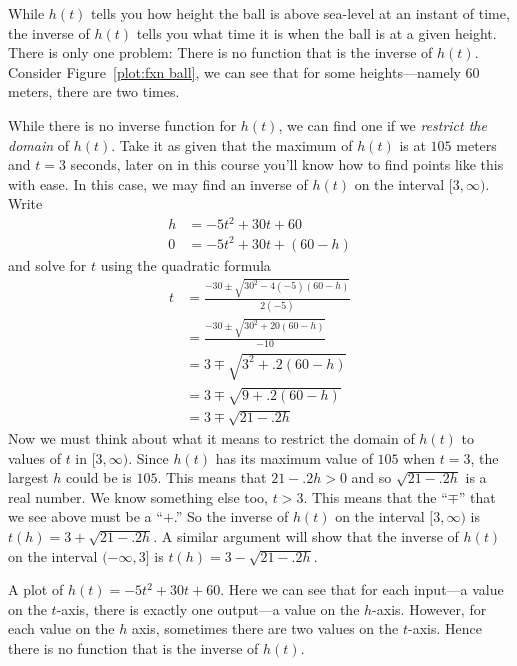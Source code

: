 \begin{solution}
While $h(t)$ tells you how height the ball is above sea-level at an
instant of time, the inverse of $h(t)$ tells you what time it is when
the ball is at a given height. There is only one problem: There is no
function that is the inverse of $h(t)$. Consider Figure~\ref{plot:fxn
  ball}, we can see that for some heights---namely 60 meters, there
are two times. 

While there is no inverse function for $h(t)$, we can find one if we
\textit{restrict the domain} of $h(t)$. Take it as given that the
maximum of $h(t)$ is at $105$ meters and $t=3$ seconds, later on in
this course you'll know how to find points like this with ease. In
this case, we may find an inverse of $h(t)$ on the interval
$[3,\infty)$. Write
\begin{align*}
h &=  -5 t^2 +30t+60\\
0 &= -5 t^2 +30t+(60 - h)
\end{align*}
and solve for $t$ using the quadratic formula
\begin{align*}
t &= \frac{-30\pm \sqrt{30^2 -4(-5)(60-h)}}{2(-5)}\\
&= \frac{-30\pm \sqrt{30^2 +20(60-h)}}{-10}\\
&=3\mp \sqrt{3^2+ .2(60-h)}\\
&=3\mp \sqrt{9+ .2(60-h)}\\
&=3\mp \sqrt{21-.2h}
\end{align*}
Now we must think about what it means to restrict the domain of $h(t)$
to values of $t$ in $[3,\infty)$. Since $h(t)$ has its maximum value
  of $105$ when $t=3$, the largest $h$ could be is $105$. This means
  that $21-.2h >0$ and so $\sqrt{21-.2h}$ is a real number. We know
  something else too, $t>3$. This means that the ``$\mp$'' that we see
  above must be a ``$+$.''  So the inverse of $h(t)$ on the interval
  $[3,\infty)$ is $t(h) = 3+ \sqrt{21-.2h}$. A similar argument will
    show that the inverse of $h(t)$ on the interval $(-\infty, 3]$ is
  $t(h) = 3- \sqrt{21-.2h}$.
\end{solution}
\begin{marginfigure}[-3in]
\caption{A plot of $h(t)=-5t^2+30t+60$. Here we can see that for each
  input---a value on the $t$-axis, there is exactly one output---a
  value on the $h$-axis. However, for each value on the $h$ axis,
  sometimes there are two values on the $t$-axis. Hence there is no
  function that is the inverse of $h(t)$.}
\label{plot:fxn ball}
\end{marginfigure}




